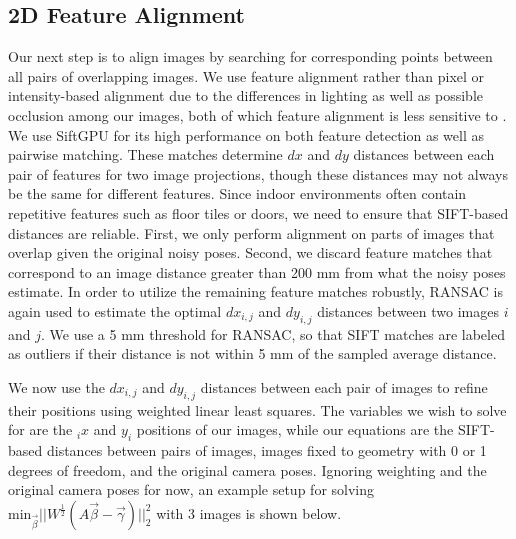 \documentclass[]{spie}  %
\begin{document}
\subsection{2D Feature Alignment}
\label{sec:robustSIFTFeatureMatching}
Our next step is to align images by searching for corresponding points
between all pairs of overlapping images. We use feature alignment
rather than pixel or intensity-based alignment due to the differences
in lighting as well as possible occlusion among our images, both of
which feature alignment is less sensitive to \cite{lowe1999object,
  mikolajczyk2005performance, szeliski2006image}.  We use SiftGPU
\cite{siftgpu} for its high performance on both feature detection as
well as pairwise matching. These matches determine $dx$ and $dy$
distances between each pair of features for two image projections,
though these distances may not always be the same for different
features. Since indoor environments often contain repetitive features
such as floor tiles or doors, we need to ensure that SIFT-based
distances are reliable. First, we only perform alignment on parts of
images that overlap given the original noisy poses. Second, we discard
feature matches that correspond to an image distance greater than 200
mm from what the noisy poses estimate. In order to utilize the
remaining feature matches robustly, RANSAC \cite{fischler1981random}
is again used to estimate the optimal $dx_{i,j}$ and $dy_{i,j}$
distances between two images $i$ and $j$. We use a 5 mm threshold for
RANSAC, so that SIFT matches are labeled as outliers if their distance
is not within 5 mm of the sampled average distance.


We now use the $dx_{i,j}$ and $dy_{i,j}$ distances between each pair
of images to refine their positions using weighted linear least
squares. The variables we wish to solve for are the $_ix$ and $y_i$
positions of our images, while our equations are the SIFT-based
distances between pairs of images, images fixed to geometry with 0 or
1 degrees of freedom, and the original camera poses. Ignoring
weighting and the original camera poses for now, an example setup for
solving $\textrm{min}_{\vec{\beta}} ||W^\frac{1}{2}(A \vec{\beta} -
\vec{\gamma})||_2^2 $ with 3 images is shown below.
\end{document}
